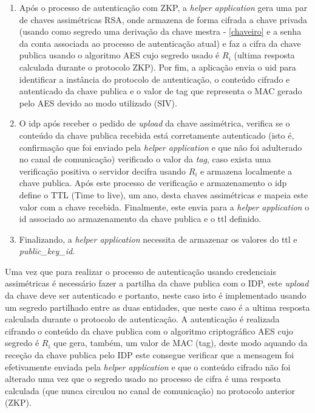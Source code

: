 \begin{enumerate}
    \item Após o processo de autenticação com ZKP, a \textit{helper application} gera uma par de chaves assimétricas RSA, onde armazena de forma cifrada a chave privada (usando como segredo uma derivação da  chave mestra - \ref{chaveiro} e a senha da conta associada ao processo de autenticação atual) e faz a cifra da chave publica usando o algoritmo AES cujo segredo usado é $R_i$ (ultima resposta calculada durante o protocolo ZKP). Por fim, a aplicação envia o uid para identificar a instância do protocolo de autenticação, o conteúdo cifrado e autenticado da chave publica e o valor de tag que representa o MAC \cite{mac} gerado pelo AES devido ao modo utilizado (SIV).
    \item O idp após receber o pedido de \textit{upload} da chave assimétrica, verifica se o conteúdo da chave publica recebida está corretamente autenticado (isto é, confirmação que foi enviado pela \textit{helper application} e que não foi adulterado no canal de comunicação) verificado o valor da \textit{tag}, caso exista uma verificação positiva o servidor decifra usando $R_i$ e armazena localmente a chave publica.  Após este processo de verificação e armazenamento o idp define o TTL (Time to live), um ano, desta chaves assimétricas e mapeia este valor com a chave recebida. Finalmente, este envia para a \textit{helper application} o id associado ao armazenamento da chave publica e o ttl definido.
    \item Finalizando, a \textit{helper application} necessita de armazenar os valores do ttl e \textit{public\_key\_id}.
\end{enumerate}

\quad Uma vez que para realizar o processo de autenticação usando credenciais assimétricas é necessário fazer a partilha da chave publica com o IDP, este \textit{upload} da chave deve ser autenticado e portanto, neste caso isto é implementado usando um segredo partilhado entre as duas entidades, que neste caso é a ultima resposta calculada durante o protocolo de autenticação. A autenticação é realizada cifrando o conteúdo da chave publica com o algoritmo criptográfico AES cujo segredo é $R_i$ que gera, também, um valor de MAC (tag), deste modo aquando da receção da chave publica pelo IDP este consegue verificar que a mensagem foi efetivamente enviada pela \textit{helper application} e que o conteúdo cifrado não foi alterado uma vez que o segredo usado no processo de cifra é uma resposta calculada (que nunca circulou no canal de comunicação) no protocolo anterior (ZKP).


